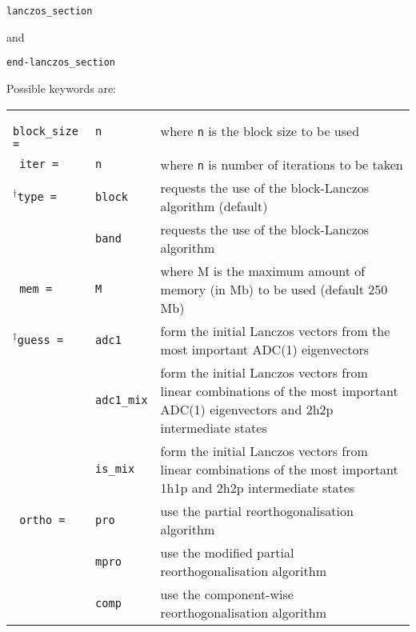 \documentclass[12pt]{article}
\newcommand*\code[1]{\mbox{\texttt{{#1}}}} %
\begin{document}
\vspace{0.2cm}
\code{lanczos\_section}

\vspace{0.2cm}
\noindent
and

\vspace{0.2cm}
\code{end-lanczos\_section}

\vspace{0.2cm}
\noindent
Possible keywords are:

\begin{table}[h]
\vspace*{1.7ex}
\begin{center}
\begin{tabular}{llp{2.5in}}
\code{ block\_size =} & \code{n} & where \code{n} is the block size to be used \\
\vspace{0.2cm}
\code{ iter =} & \code{n} & where \code{n} is number of iterations to be taken \\
\vspace{0.2cm}
$^{\dagger}$\code{type =} & \code{block} & requests the use of the block-Lanczos algorithm (default) \\
              & \code{band} & requests the use of the block-Lanczos algorithm \\
\vspace{0.2cm}
\code{ mem =} & \code{M} & where M is the maximum amount of memory (in Mb) to be used (default 250 Mb) \\
\vspace{0.2cm}
$^{\ddagger}$\code{guess =} & \code{adc1} & form the initial Lanczos vectors from the most important ADC(1) eigenvectors \\
               & \code{adc1\_mix} & form the initial Lanczos vectors from linear combinations of the most important ADC(1) eigenvectors and 2h2p intermediate states\\
               & \code{is\_mix} & form the initial Lanczos vectors from linear combinations of the most important 1h1p and 2h2p intermediate states \\
\vspace{0.2cm}
\code{ ortho =} & \code{pro} & use the partial reorthogonalisation algorithm \\
                & \code{mpro} & use the modified partial reorthogonalisation algorithm \\
                & \code{comp} & use the component-wise reorthogonalisation algorithm \\
\end{tabular}
\end{center}
\end{table}
\end{document}
